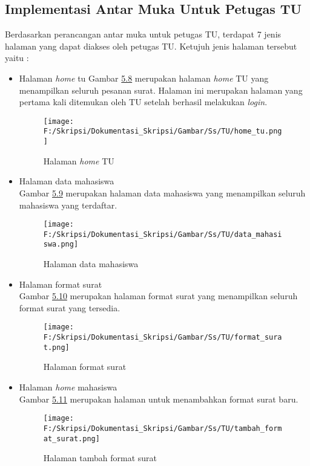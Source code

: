 \subsection{Implementasi Antar Muka Untuk Petugas TU}
\label{sec:implementasi_antar_muka_petugas_tu}
Berdasarkan perancangan antar muka untuk petugas TU, terdapat 7 jenis halaman yang dapat diakses oleh petugas TU. Ketujuh jenis halaman tersebut yaitu :
\begin{itemize}
	\item Halaman \textit{home} tu
	 Gambar \hyperlink{halaman_home_tu}{5.8} merupakan halaman \textit{home} TU yang menampilkan seluruh pesanan surat. Halaman ini merupakan halaman yang pertama kali ditemukan oleh TU setelah berhasil melakukan \textit{login}.
	 \begin{figure}[H]
	\centering
		\texttt{[image: F:/Skripsi/Dokumentasi\_Skripsi/Gambar/Ss/TU/home\_tu.png]}
		\caption{Halaman \textit{home} TU}
		\label{fig:halaman_home_tu}
	\end{figure}

	\item Halaman data mahasiswa\\
	 Gambar \hyperlink{implementasi_halaman_data_mahasiswa}{5.9} merupakan halaman data mahasiswa yang menampilkan seluruh mahasiswa yang terdaftar.
	 \begin{figure}[H]
	\centering
		\texttt{[image: F:/Skripsi/Dokumentasi\_Skripsi/Gambar/Ss/TU/data\_mahasiswa.png]}
		\caption{Halaman data mahasiswa}
		\label{fig:implementasi_halaman_data_mahasiswa}
	\end{figure}
	
	\item Halaman format surat\\
	 Gambar \hyperlink{implementasi_halaman_format_surat}{5.10} merupakan halaman format surat yang menampilkan seluruh format surat yang tersedia.
	 \begin{figure}[H]
	\centering
		\texttt{[image: F:/Skripsi/Dokumentasi\_Skripsi/Gambar/Ss/TU/format\_surat.png]}
		\caption{Halaman format surat}
		\label{fig:implementasi_halaman_format_surat}
	\end{figure}
	
	\item Halaman \textit{home} mahasiswa\\
	 Gambar \hyperlink{implementasi_halaman_tambah_format_surat}{5.11} merupakan halaman untuk menambahkan format surat baru.
	 \begin{figure}[H]
	\centering
		\texttt{[image: F:/Skripsi/Dokumentasi\_Skripsi/Gambar/Ss/TU/tambah\_format\_surat.png]}
		\caption{Halaman tambah format surat}
		\label{fig:implementasi_halaman_tambah_format_surat}
	\end{figure}
	

\end{itemize}
